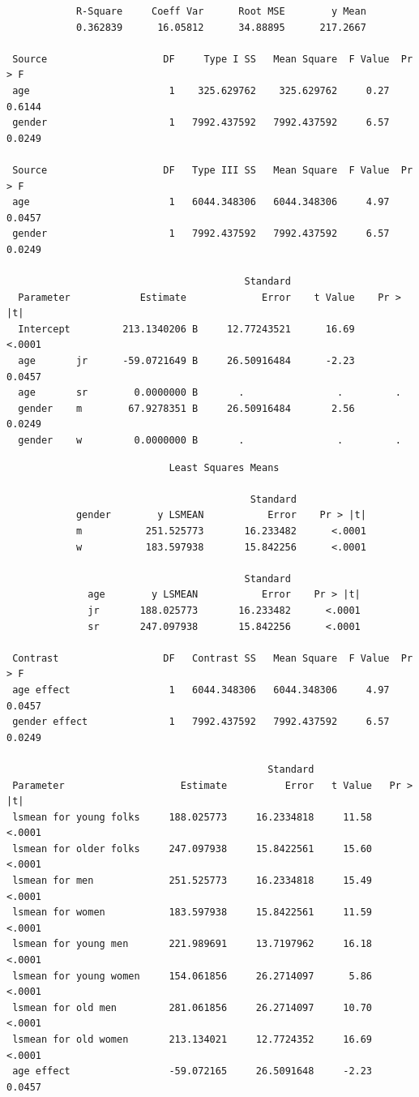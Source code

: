 \begin{large}
\begin{verbatim}
            R-Square     Coeff Var      Root MSE        y Mean
            0.362839      16.05812      34.88895      217.2667

 Source                    DF     Type I SS   Mean Square  F Value  Pr > F
 age                        1    325.629762    325.629762     0.27  0.6144
 gender                     1   7992.437592   7992.437592     6.57  0.0249

 Source                    DF   Type III SS   Mean Square  F Value  Pr > F
 age                        1   6044.348306   6044.348306     4.97  0.0457
 gender                     1   7992.437592   7992.437592     6.57  0.0249

                                         Standard
  Parameter            Estimate             Error    t Value    Pr > |t|
  Intercept         213.1340206 B     12.77243521      16.69      <.0001
  age       jr      -59.0721649 B     26.50916484      -2.23      0.0457
  age       sr        0.0000000 B       .                .         .    
  gender    m        67.9278351 B     26.50916484       2.56      0.0249
  gender    w         0.0000000 B       .                .         .    
\end{verbatim}
\newpage
\begin{verbatim}
                            Least Squares Means

                                          Standard
            gender        y LSMEAN           Error    Pr > |t|
            m           251.525773       16.233482      <.0001
            w           183.597938       15.842256      <.0001

                                         Standard
              age        y LSMEAN           Error    Pr > |t|
              jr       188.025773       16.233482      <.0001
              sr       247.097938       15.842256      <.0001
 
 Contrast                  DF   Contrast SS   Mean Square  F Value  Pr > F
 age effect                 1   6044.348306   6044.348306     4.97  0.0457
 gender effect              1   7992.437592   7992.437592     6.57  0.0249

                                             Standard
 Parameter                    Estimate          Error   t Value   Pr > |t|
 lsmean for young folks     188.025773     16.2334818     11.58     <.0001
 lsmean for older folks     247.097938     15.8422561     15.60     <.0001
 lsmean for men             251.525773     16.2334818     15.49     <.0001
 lsmean for women           183.597938     15.8422561     11.59     <.0001
 lsmean for young men       221.989691     13.7197962     16.18     <.0001
 lsmean for young women     154.061856     26.2714097      5.86     <.0001
 lsmean for old men         281.061856     26.2714097     10.70     <.0001
 lsmean for old women       213.134021     12.7724352     16.69     <.0001
 age effect                 -59.072165     26.5091648     -2.23     0.0457
\end{verbatim}
\end{large}

